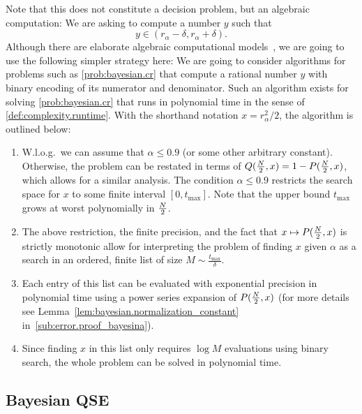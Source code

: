 Note that this does not constitute a decision problem, but an algebraic computation:
We are asking to compute a number $y$ such that
\[
  \label{eq:bayesian.precission}
  y \in (r_\alpha - \delta, r_\alpha + \delta).
\]
Although there are elaborate algebraic computational models~\cite[Sec.\ 16]{Arora_2009_Computational}, we are going to use the following simpler strategy here:
We are going to consider algorithms for problems such as \cref{prob:bayesian.cr} that compute a rational number $y$ with binary encoding of its numerator and denominator.
Such an algorithm exists for solving \cref{prob:bayesian.cr} that runs in polynomial time in the sense of \cref{def:complexity.runtime}.
With the shorthand notation $x = r^2_{\alpha}/2$, the algorithm is outlined below:
\begin{enumerate}
  \item W.l.o.g.\ we can assume that $\alpha \le 0.9$ (or some other arbitrary constant).
  Otherwise, the problem can be restated in terms of $Q(\tfrac{N}{2}, x) = 1 - P(\tfrac{N}{2}, x)$, which allows for a similar analysis.
  The condition $\alpha \le 0.9$ restricts the search space for $x$ to some finite interval $[0, t_\mathrm{max}]$.
  Note that the upper bound $t_\mathrm{max}$ grows at worst polynomially in $\tfrac{N}{2}$.
  \item The above restriction, the finite precision, and the fact that $x \mapsto P(\tfrac{N}{2}, x)$ is strictly monotonic allow for interpreting the problem of finding $x$ given $\alpha$ as a search in an ordered, finite list of size $M \sim \tfrac{t_\mathrm{max}}{\delta}$.
  \item Each entry of this list can be evaluated with exponential precision in polynomial time using a power series expansion of $P(\tfrac{N}{2}, x)$ (for more details see Lemma~\ref{lem:bayesian.normalization_constant} in~\ref{sub:error.proof_bayesina}).
  \item Since finding $x$ in this list only requires $\log M$ evaluations using binary search, the whole problem can be solved in polynomial time.
\end{enumerate}


\subsection{Bayesian QSE}
\label{sub:bayesian.tomography}

